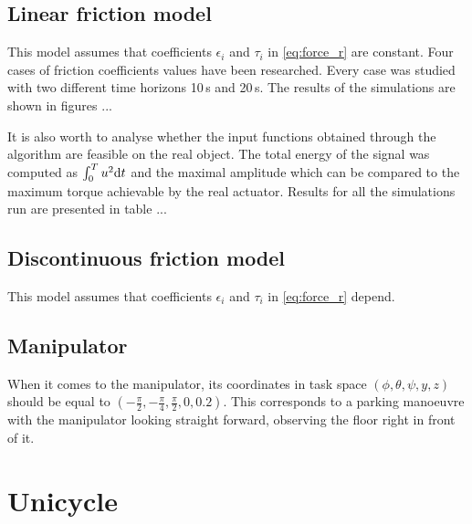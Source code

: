 \subsection{Linear friction model}
This model assumes that coefficients $\epsilon_i$ and $\tau_i$ in \eqref{eq:force_r} are constant. Four cases of friction coefficients values have been researched. Every case was studied with two different time horizons 10\,s and 20\,s. The results of the simulations are shown in figures ...

It is also worth to analyse whether the input functions obtained through the algorithm are feasible on the real object. The total energy of the signal was computed as $\int_0^T u^2\mathrm{d} t$ and the maximal amplitude which can be compared to the maximum torque achievable by the real actuator. Results for all the simulations run are presented in table ...



\subsection{Discontinuous friction model}
This model assumes that coefficients $\epsilon_i$ and $\tau_i$ in \eqref{eq:force_r} depend.

\subsection{Manipulator}
When it comes to the manipulator,
its coordinates in task space $(\phi, \theta, \psi, y, z) $ should be equal to
$(-\frac{\pi}{2}, -\frac{\pi}{4}, \frac{\pi}{2}, 0, 0.2)$.
This corresponds to a parking manoeuvre with the manipulator
looking straight forward, observing the floor right in front of it.
\section{Unicycle}